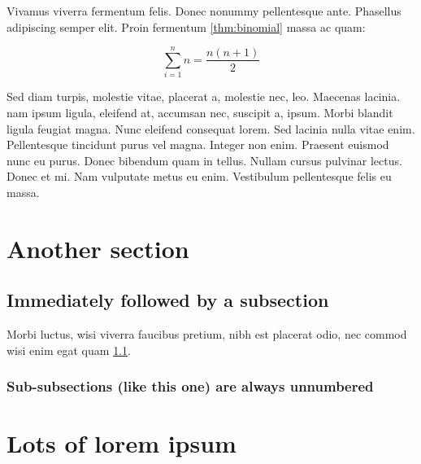 \documentclass{rntz}
\begin{document}
Vivamus viverra fermentum felis. Donec nonummy pellentesque ante. Pha\-sellus
adipiscing semper elit. Proin fermentum \cref{thm:binomial} massa ac quam:

\[ \sum_{i=1}^n n = \frac{n(n+1)}{2} \]


Sed diam turpis, molestie vitae, placerat a, molestie nec, leo. Maecenas
lacinia.  nam ipsum ligula, eleifend at, accumsan nec, suscipit a,
ipsum. Morbi blandit ligula feugiat magna. Nunc eleifend consequat lorem. Sed
lacinia nulla vitae enim. Pellentesque tincidunt purus vel magna. Integer non
enim. Praesent euismod nunc eu purus. Donec bibendum quam in tellus. Nullam
cursus pulvinar lectus. Donec et mi. Nam vulputate metus eu enim. Vestibulum
pellentesque felis eu massa.

\section{Another section}\label{sec:two}
\subsection{Immediately followed by a subsection}\label{sec:two-one}

\lipsum[6]

\begin{conjecture}
  Morbi luctus, wisi viverra faucibus pretium, nibh est placerat odio, nec
  commod wisi enim egat quam \cref{sec:two-one}.
\end{conjecture}

\subsubsection{Sub-subsections (like this one) are always unnumbered}

\lipsum[7-8]


\section{Lots of lorem ipsum}
\lipsum\lipsum[1]\lipsum\lipsum[2]\lipsum\lipsum[3]\lipsum\lipsum[4]
\lipsum\lipsum[5]\lipsum\lipsum[6]\lipsum\lipsum[7]\lipsum\lipsum[8]
\lipsum\lipsum[1]\lipsum\lipsum[2]\lipsum\lipsum[3]\lipsum\lipsum[4]
\lipsum\lipsum[5]\lipsum\lipsum[6]\lipsum\lipsum[7]\lipsum\lipsum[8]
\end{document}
